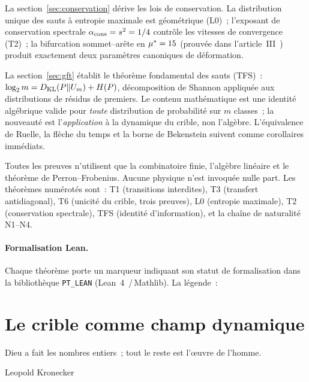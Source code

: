\documentclass[12pt,a4paper]{article}
\begin{document}
La section~\ref{sec:conservation} dérive les lois de conservation. La
distribution unique des sauts à entropie maximale est géométrique
(L0)~; l'exposant de conservation spectrale
$\alpha_{\rm cons} = s^2 = 1/4$ contrôle les vitesses de convergence
(T2)~; la bifurcation sommet--arête en ${\mu^{*}} = 15$ (prouvée dans
l'article~III~\cite{companion_M3}) produit exactement deux paramètres
canoniques de déformation.

La section~\ref{sec:gft} établit le théorème fondamental des sauts
(TFS)~: $\log_2 m = D_{\mathrm{KL}}(P\|U_m) + H(P)$, décomposition de Shannon
appliquée aux distributions de résidus de premiers. Le contenu
mathématique est une identité algébrique valide pour \emph{toute}
distribution de probabilité sur $m$ classes~; la nouveauté est
l'\emph{application} à la dynamique du crible, non l'algèbre.
L'équivalence de Ruelle, la flèche du temps et la borne de Bekenstein
suivent comme corollaires immédiats.

Toutes les preuves n'utilisent que la combinatoire finie, l'algèbre
linéaire et le théorème de Perron--Frobenius. Aucune physique n'est
invoquée nulle part. Les théorèmes numérotés sont~: T1 (transitions
interdites), T3 (transfert antidiagonal), T6 (unicité du crible,
trois preuves), L0 (entropie maximale), T2 (conservation spectrale),
TFS (identité d'information), et la chaîne de naturalité N1--N4.

\paragraph{Formalisation Lean.}
Chaque théorème porte un marqueur indiquant son statut de
formalisation dans la bibliothèque \texttt{PT\_LEAN} (Lean~4
\,/\,Mathlib). La légende~:
\leanLegend{}


\section{Le crible comme champ dynamique}
\label{sec:sieve}

\epigraph{Dieu a fait les nombres entiers~; tout le reste est l'\oe uvre de l'homme.}{Leopold Kronecker}
\end{document}
